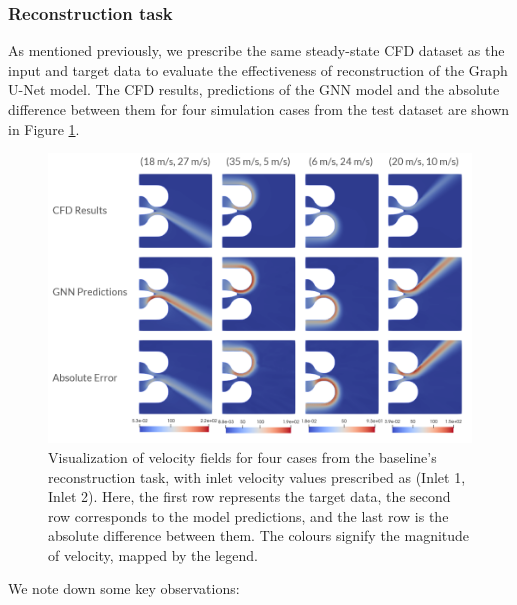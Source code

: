 \subsubsection{Reconstruction task}
As mentioned previously, we prescribe the same steady-state CFD dataset as the input and target data to evaluate the effectiveness of reconstruction of the Graph U-Net model. The CFD results, predictions of the GNN model and the absolute difference between them for four simulation cases from the test dataset are shown in Figure \ref{blrecon}.\\
\begin{figure}[ht]
    \centering
    \includegraphics[width=14cm]{images/Methodology/allvelrecon.png}
    \caption{Visualization of velocity fields for four cases from the baseline's reconstruction task, with inlet velocity values prescribed as (Inlet 1, Inlet 2). Here, the first row represents the target data, the second row corresponds to the model predictions, and the last row is the absolute difference between them. The colours signify the magnitude of velocity, mapped by the legend.} 
    \label{blrecon}
\end{figure}
We note down some key observations: 
